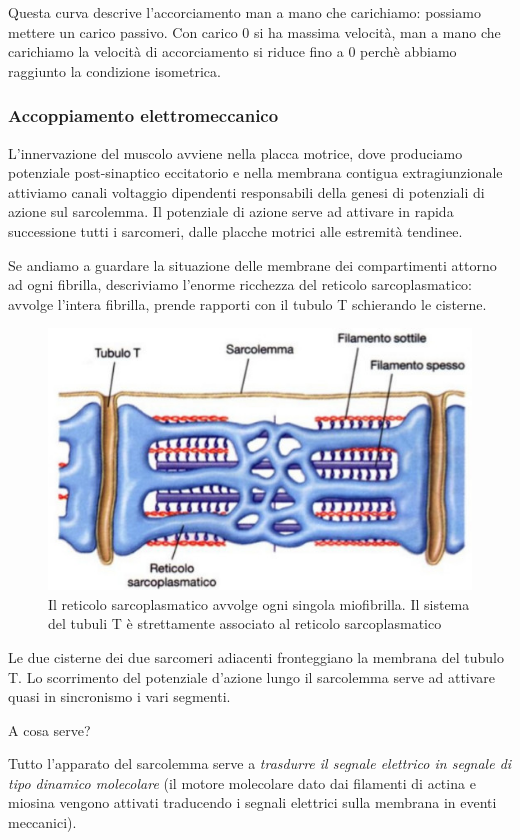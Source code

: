\documentclass[a4paper,12pt]{article}
\begin{document}
Questa curva descrive l'accorciamento man a mano che carichiamo: possiamo mettere un carico passivo. Con carico 0 si ha massima velocità, man a mano che carichiamo la velocità di accorciamento si riduce fino a 0 perchè abbiamo raggiunto la condizione isometrica.

\subsubsection{Accoppiamento elettromeccanico}
L'innervazione del muscolo avviene nella placca motrice, dove produciamo potenziale post-sinaptico eccitatorio e nella membrana contigua extragiunzionale attiviamo canali voltaggio dipendenti responsabili della genesi di potenziali di azione sul sarcolemma. Il potenziale di azione serve ad attivare in rapida successione tutti i sarcomeri, dalle placche motrici alle estremità tendinee. 

Se andiamo a guardare la situazione delle membrane dei compartimenti attorno ad ogni fibrilla, descriviamo l'enorme ricchezza del reticolo sarcoplasmatico: avvolge l'intera fibrilla, prende rapporti con il tubulo T schierando le cisterne.
\begin{figure}[H]
\centering
\includegraphics[scale=0.4]{immagine/sarco.jpg}
\caption{Il reticolo sarcoplasmatico avvolge ogni singola miofibrilla. Il sistema del tubuli T è strettamente associato al reticolo sarcoplasmatico}
\end{figure}
Le due cisterne dei due sarcomeri adiacenti fronteggiano la membrana del tubulo T. Lo scorrimento del potenziale d'azione lungo il sarcolemma serve ad attivare quasi in sincronismo i vari segmenti. 

A cosa serve? 

Tutto l'apparato del sarcolemma serve a \emph{trasdurre il segnale elettrico in segnale di tipo dinamico molecolare} (il motore molecolare dato dai filamenti di actina e miosina vengono attivati traducendo i segnali elettrici sulla membrana in eventi meccanici). 
\end{document}
